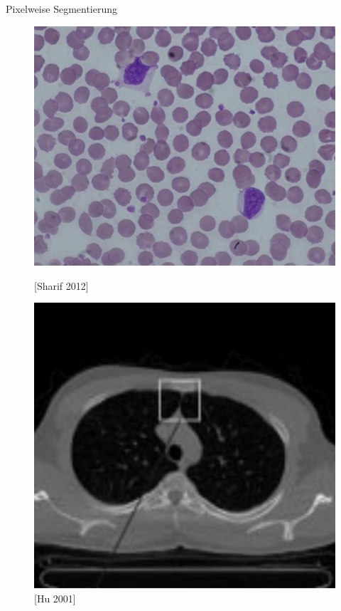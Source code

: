 \begin{frame}{Pixelweise Segmentierung}
    \begin{figure}[ht]
        \begin{minipage}[b]{0.45\linewidth}
            \centering
            \includegraphics[width=\textwidth]{../images/red-blood.png}
            \caption{[Sharif 2012]}
            \label{fig:red-blood}
        \end{minipage}
        \hspace{0.5cm}
        \begin{minipage}[b]{0.45\linewidth}
            \centering
            \includegraphics[width=\textwidth]{../images/lung.png}
            \caption{[Hu 2001]}
            \label{fig:lung}
        \end{minipage}
    \end{figure}
\end{frame}
